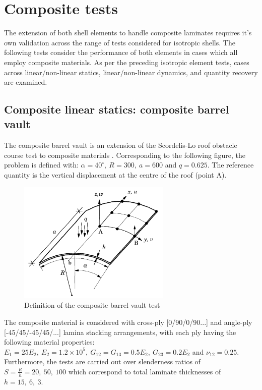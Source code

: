 \section{Composite tests}

The extension of both shell elements to handle composite laminates requires it's own validation across the range of tests considered for isotropic shells. The following tests consider the performance of both elements in cases which all employ composite materials. As per the preceding isotropic element tests, cases across linear/non-linear statics, linear/non-linear dynamics, and quantity recovery are examined.

\subsection{Composite linear statics: composite barrel vault}
\label{validation:composite barrel vault}
The composite barrel vault is an extension of the Scordelis-Lo roof obstacle course test to composite materials \cite{reddy2004mechanics}. Corresponding to the following figure, the problem is defined with: $\alpha = 40^{\circ},\ R = 300,\ a = 600$ and $q = 0.625$. The reference quantity is the vertical displacement at the centre of the roof (point A).

\begin{figure}[H]
	\centering
	\def\svgwidth{\columnwidth}
	\includegraphics[width=7.3cm]{images/composite_barrel_vault_def.png}
	\caption{Definition of the composite barrel vault test \cite{reddy2004mechanics}}
\end{figure}

The composite material is considered with cross-ply [0/90/0/90...] and angle-ply [-45/45/-45/45/...] lamina stacking arrangements, with each ply having the following material properties: $E_1 = 25 E_2,\ E_2 = 1.2 \times 10^5,\ G_{12} = G_{13} = 0.5 E_2,\ G_{23} = 0.2 E_2$ and $\nu_{12} = 0.25$. Furthermore, the tests are carried out over slenderness ratios of $S = \frac{R}{h} = 20,\ 50,\ 100$ which correspond to total laminate thicknesses of $h = 15,\ 6,\ 3$.

